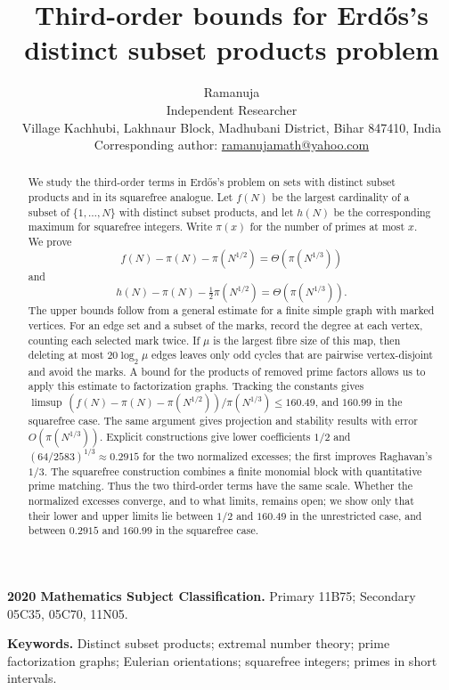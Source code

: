 \documentclass[11pt]{article}
\title{Third-order bounds for Erd\H{o}s's distinct subset products problem}
\author{Ramanuja\\[2pt]
\small Independent Researcher\\
\small Village Kachhubi, Lakhnaur Block, Madhubani District, Bihar 847410, India\\
\small Corresponding author: \href{mailto:ramanujamath@yahoo.com}{ramanujamath@yahoo.com}}
\date{}
\numberwithin{equation}{section}
\theoremstyle{remark}
\begin{document}
\maketitle

\begin{abstract}
We study the third-order terms in Erd\H{o}s's problem on sets with distinct subset products and in its squarefree analogue. Let $f(N)$ be the largest cardinality of a subset of $\{1,\dots,N\}$ with distinct subset products, and let $h(N)$ be the corresponding maximum for squarefree integers. Write $\pi(x)$ for the number of primes at most $x$. We prove
\[
f(N)-\pi(N)-\pi(N^{1/2})=\Theta(\pi(N^{1/3}))
\]
and
\[
h(N)-\pi(N)-\tfrac12\pi(N^{1/2})=\Theta(\pi(N^{1/3})).
\]
The upper bounds follow from a general estimate for a finite simple graph with marked vertices. For an edge set and a subset of the marks, record the degree at each vertex, counting each selected mark twice. If $\mu$ is the largest fibre size of this map, then deleting at most $20\log_2\mu$ edges leaves only odd cycles that are pairwise vertex-disjoint and avoid the marks. A bound for the products of removed prime factors allows us to apply this estimate to factorization graphs. Tracking the constants gives $\limsup\,(f(N)-\pi(N)-\pi(N^{1/2}))/\pi(N^{1/3})\le160.49$, and $160.99$ in the squarefree case. The same argument gives projection and stability results with error $O(\pi(N^{1/3}))$. Explicit constructions give lower coefficients $1/2$ and $(64/2583)^{1/3}\approx0.2915$ for the two normalized excesses; the first improves Raghavan's $1/3$. The squarefree construction combines a finite monomial block with quantitative prime matching. Thus the two third-order terms have the same scale. Whether the normalized excesses converge, and to what limits, remains open; we show only that their lower and upper limits lie between $1/2$ and $160.49$ in the unrestricted case, and between $0.2915$ and $160.99$ in the squarefree case.
\end{abstract}

\noindent\textbf{2020 Mathematics Subject Classification.} Primary 11B75; Secondary 05C35, 05C70, 11N05.

\noindent\textbf{Keywords.} Distinct subset products; extremal number theory; prime factorization graphs; Eulerian orientations; squarefree integers; primes in short intervals.

\end{document}

